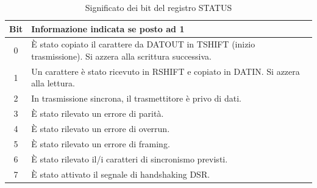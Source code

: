 \begin{table}[ht]
    \centering
    \begin{tabular}{|c|p{11cm}|}
    \hline
    \textbf{Bit} & \textbf{Informazione indicata se posto ad 1} \\
    \hline
    0 & È stato copiato il carattere da DATOUT in TSHIFT (inizio trasmissione). Si azzera alla scrittura successiva. \\
    1 & Un carattere è stato ricevuto in RSHIFT e copiato in DATIN. Si azzera alla lettura. \\
    2 & In trasmissione sincrona, il trasmettitore è privo di dati. \\
    3 & È stato rilevato un errore di parità. \\
    4 & È stato rilevato un errore di overrun. \\
    5 & È stato rilevato un errore di framing. \\
    6 & È stato rilevato il/i caratteri di sincronismo previsti. \\
    7 & È stato attivato il segnale di handshaking DSR. \\
    \hline
    \end{tabular}
    \caption{Significato dei bit del registro STATUS}\label{tab:STAT-8251}
\end{table}
    
  